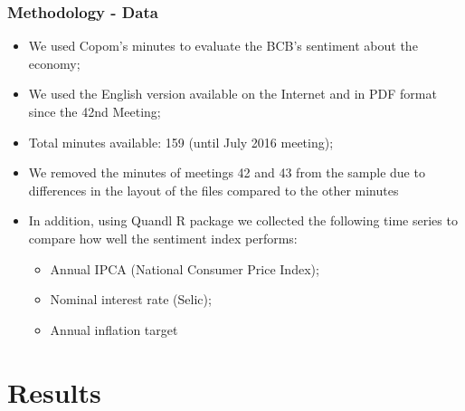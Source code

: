 \documentclass[aspectratio=169]{beamer}
\begin{document}
\begin{frame}\frametitle{Methodology - Data}
  \begin{itemize}
  	\item We used Copom's minutes to evaluate the BCB's sentiment about the economy;
    \item We used the English version available on the Internet and in PDF format since the 42nd Meeting;
    \item Total minutes available: 159 (until July 2016 meeting);
    \item We removed the minutes of meetings 42 and 43 from the sample due to differences in the layout of the files compared to the other minutes 
    \item In addition, using Quandl R package we collected the following time series to compare how well the sentiment index performs:
    \begin{itemize}
      \item Annual IPCA (National Consumer Price Index);
      \item Nominal interest rate (Selic);
      \item Annual inflation target
    \end{itemize}
  \end{itemize}
\end{frame}


\section{Results}
\end{document}
